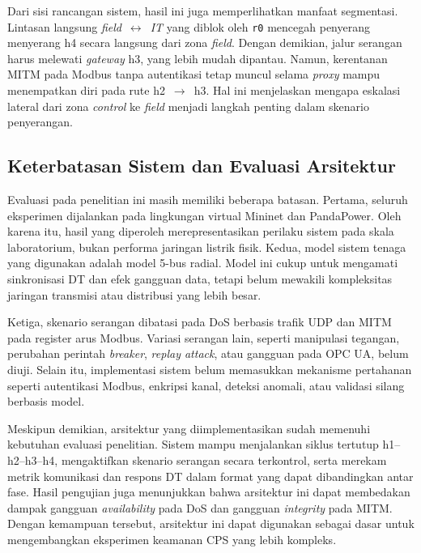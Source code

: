 Dari sisi rancangan sistem, hasil ini juga memperlihatkan manfaat segmentasi. Lintasan langsung \textit{field}~$\leftrightarrow$~\textit{IT} yang diblok oleh \texttt{r0} mencegah penyerang menyerang h4 secara langsung dari zona \textit{field}. Dengan demikian, jalur serangan harus melewati \textit{gateway} h3, yang lebih mudah dipantau. Namun, kerentanan \ac{MITM} pada Modbus tanpa autentikasi tetap muncul selama \textit{proxy} mampu menempatkan diri pada rute h2~$\rightarrow$~h3. Hal ini menjelaskan mengapa eskalasi lateral dari zona \textit{control} ke \textit{field} menjadi langkah penting dalam skenario penyerangan.

\subsection{Keterbatasan Sistem dan Evaluasi Arsitektur}
\label{subsec:keterbatasan_sistem}
Evaluasi pada penelitian ini masih memiliki beberapa batasan. Pertama, seluruh eksperimen dijalankan pada lingkungan virtual Mininet dan PandaPower. Oleh karena itu, hasil yang diperoleh merepresentasikan perilaku sistem pada skala laboratorium, bukan performa jaringan listrik fisik. Kedua, model sistem tenaga yang digunakan adalah model 5-bus radial. Model ini cukup untuk mengamati sinkronisasi \ac{DT} dan efek gangguan data, tetapi belum mewakili kompleksitas jaringan transmisi atau distribusi yang lebih besar.

Ketiga, skenario serangan dibatasi pada \ac{DoS} berbasis trafik UDP dan \ac{MITM} pada register arus Modbus. Variasi serangan lain, seperti manipulasi tegangan, perubahan perintah \textit{breaker}, \textit{replay attack}, atau gangguan pada OPC UA, belum diuji. Selain itu, implementasi sistem belum memasukkan mekanisme pertahanan seperti autentikasi Modbus, enkripsi kanal, deteksi anomali, atau validasi silang berbasis model.

Meskipun demikian, arsitektur yang diimplementasikan sudah memenuhi kebutuhan evaluasi penelitian. Sistem mampu menjalankan siklus tertutup h1--h2--h3--h4, mengaktifkan skenario serangan secara terkontrol, serta merekam metrik komunikasi dan respons \ac{DT} dalam format yang dapat dibandingkan antar fase. Hasil pengujian juga menunjukkan bahwa arsitektur ini dapat membedakan dampak gangguan \textit{availability} pada \ac{DoS} dan gangguan \textit{integrity} pada \ac{MITM}. Dengan kemampuan tersebut, arsitektur ini dapat digunakan sebagai dasar untuk mengembangkan eksperimen keamanan \ac{CPS} yang lebih kompleks.
